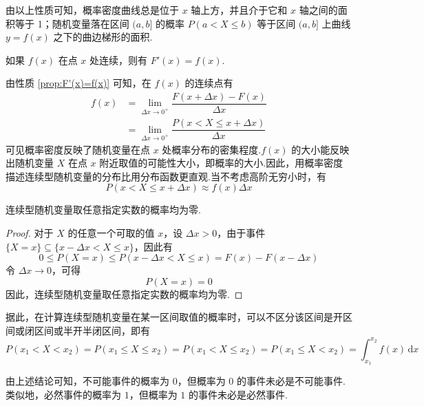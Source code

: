 由以上性质可知，概率密度曲线总是位于 $x$ 轴上方，并且介于它和 $x$ 轴之间的面积等于 1；随机变量落在区间 $(a,b]$ 的概率 $P(a < X \leqslant b)$ 等于区间 $(a,b]$ 上曲线 $y=f(x)$ 之下的曲边梯形的面积.

\begin{property}[][][prop:F'(x)=f(x)]
    \indent 如果 $f(x)$ 在点 $x$ 处连续，则有 $F'(x)=f(x)$.
\end{property}

由性质 \ref{prop:F'(x)=f(x)} 可知，在 $f(x)$ 的连续点有
$$
\begin{aligned}
    f(x) &= \lim_{\Delta x \to 0^+} \dfrac{F(x + \Delta x)-F(x)}{\Delta x}\\
    &= \lim_{\Delta x \to 0^+} \dfrac{P(x < X \leqslant x + \Delta x)}{\Delta x}
\end{aligned}
$$
可见概率密度反映了随机变量在点 $x$ 处概率分布的密集程度.$f(x)$ 的大小能反映出随机变量 $X$ 在点 $x$ 附近取值的可能性大小，即概率的大小.因此，用概率密度描述连续型随机变量的分布比用分布函数更直观.当不考虑高阶无穷小时，有
$$
P(x < X \leqslant x + \Delta x) \approx f(x) \Delta x
$$

\begin{conclusion}
    \indent 连续型随机变量取任意指定实数的概率均为零.
\end{conclusion}

\begin{proof}
    对于 $X$ 的任意一个可取的值 $x$，设 $\Delta x > 0$，由于事件 $\{X=x\} \subseteq \{x - \Delta x < X \leqslant x\}$，因此有
    $$
    0 \leqslant P(X=x) \leqslant P(x - \Delta x < X \leqslant x) = F(x)-F(x-\Delta x)
    $$
    令 $\Delta x \to 0$，可得
    $$
    P(X=x)=0
    $$
    因此，连续型随机变量取任意指定实数的概率均为零.
\end{proof}

据此，在计算连续型随机变量在某一区间取值的概率时，可以不区分该区间是开区间或闭区间或半开半闭区间，即有
$$
P(x_1 < X < x_2) = P(x_1 \leqslant X \leqslant x_2) = P(x_1 < X \leqslant x_2) = P(x_1 \leqslant X < x_2) = \int_{x_1}^{x_2} f(x)\,\text{d}x
$$

由上述结论可知，不可能事件的概率为 $0$，但概率为 $0$ 的事件未必是不可能事件.类似地，必然事件的概率为 $1$，但概率为 $1$ 的事件未必是必然事件.

